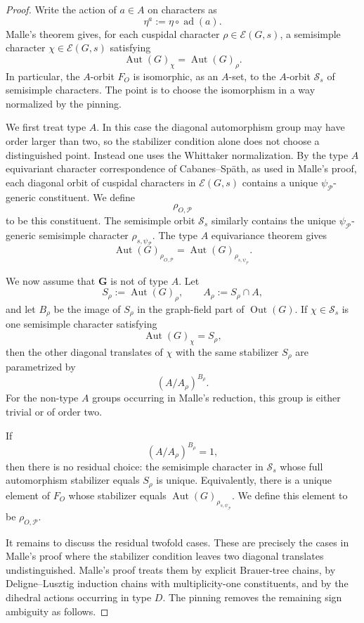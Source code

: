 \documentclass[10pt,a4paper]{amsart}
\newcommand{\Aut}{\operatorname{Aut}}
\newcommand{\Out}{\operatorname{Out}}
\newcommand{\ad}{\operatorname{ad}}
\newcommand{\cE}{\mathcal{E}}
\newcommand{\cP}{\mathcal{P}}
\begin{document}
\begin{proof}
Write the action of \(a\in A\) on characters as
\[
        \eta^a:=\eta\circ \ad(a).
\]
Malle's theorem gives, for each cuspidal character
\(\rho\in \cE(G,s)\), a semisimple character
\(\chi\in \cE(G,s)\) satisfying
\[
        \Aut(G)_\chi=\Aut(G)_\rho.
\]
In particular, the \(A\)-orbit \(F_O\) is isomorphic, as an \(A\)-set, to the
\(A\)-orbit \(\mathcal S_s\) of semisimple characters.  The point is to choose
the isomorphism in a way normalized by the pinning.

We first treat type \(A\).  In this case the diagonal automorphism group may
have order larger than two, so the stabilizer condition alone does not choose
a distinguished point.  Instead one uses the Whittaker normalization.  By the
type \(A\) equivariant character correspondence of Cabanes--Späth, as used in
Malle's proof, each diagonal orbit of cuspidal characters in \(\cE(G,s)\)
contains a unique \(\psi_{\cP}\)-generic constituent.  We define
\[
        \rho_{O,\cP}
\]
to be this constituent.  The semisimple orbit \(\mathcal S_s\) similarly
contains the unique \(\psi_{\cP}\)-generic semisimple character
\(\rho_{s,\psi_{\cP}}\).  The type \(A\) equivariance theorem gives
\[
        \Aut(G)_{\rho_{O,\cP}}
        =
        \Aut(G)_{\rho_{s,\psi_{\cP}}}.
\]

We now assume that \(\mathbf G\) is not of type \(A\).  Let
\[
        S_\rho:=\Aut(G)_\rho,\qquad A_\rho:=S_\rho\cap A,
\]
and let \(B_\rho\) be the image of \(S_\rho\) in the graph-field part of
\(\Out(G)\).  If \(\chi\in\mathcal S_s\) is one semisimple character satisfying
\[
        \Aut(G)_\chi=S_\rho,
\]
then the other diagonal translates of \(\chi\) with the same stabilizer
\(S_\rho\) are parametrized by
\[
        (A/A_\rho)^{B_\rho}.
\]
For the non-type \(A\) groups occurring in Malle's reduction, this group is
either trivial or of order two.

If
\[
        (A/A_\rho)^{B_\rho}=1,
\]
then there is no residual choice: the semisimple character in
\(\mathcal S_s\) whose full automorphism stabilizer equals \(S_\rho\) is unique.
Equivalently, there is a unique element of \(F_O\) whose stabilizer equals
\(\Aut(G)_{\rho_{s,\psi_{\cP}}}\).  We define this element to be
\(\rho_{O,\cP}\).

It remains to discuss the residual twofold cases.  These are precisely the
cases in Malle's proof where the stabilizer condition leaves two diagonal
translates undistinguished.  Malle's proof treats them by explicit Brauer-tree
chains, by Deligne--Lusztig induction chains with multiplicity-one
constituents, and by the dihedral actions occurring in type \(D\).  The pinning
removes the remaining sign ambiguity as follows.


\end{proof}
\end{document}
